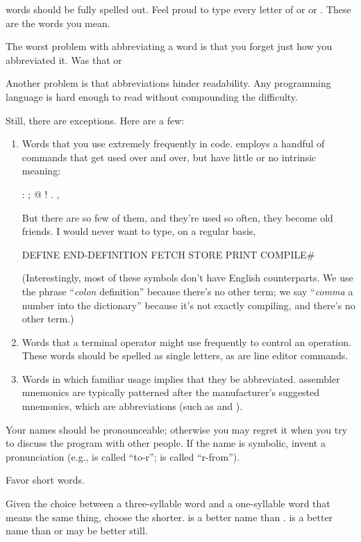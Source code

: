 \Forth{} words should be fully spelled out.  Feel proud to type every
letter of  or  or .
These are the words you mean.

The worst problem with abbreviating a word is that you forget just
how you abbreviated it.  Was that  or 

Another problem is that abbreviations hinder readability.
Any programming language is hard enough to read without compounding
the difficulty.

Still, there are exceptions.  Here are a few:

\begin{enumerate}
\item Words that you use extremely frequently in code. \Forth{}
employs a handful of commands that get used over and over, but have
little or no intrinsic meaning:
\begin{Code}
:   ;   @   !   .   ,
\end{Code}
But there are so few of them, and they're used so often, they become
old friends.  I would never want to type, on a regular basis,
\begin{Code}
DEFINE   END-DEFINITION   FETCH   STORE
     PRINT   COMPILE#
\end{Code}
(Interestingly, most of these symbols don't have English counterparts.
We use the phrase ``\emph{colon} definition'' because there's no other
term; we say ``\emph{comma} a number into the dictionary'' because
it's not exactly compiling, and there's no other term.)
\item Words that a terminal operator might use frequently to control
an operation.  These words should be spelled as single letters, as are
line editor commands.
\item Words in which familiar usage implies that they be abbreviated.
\Forth{} assembler mnemonics are typically patterned after the
manufacturer's suggested mnemonics, which are abbreviations (such as
 and ).
\end{enumerate}
Your names should be pronounceable; otherwise you may regret it when
you try to discuss the program with other people.  If the name is
symbolic, invent a pronunciation (e.g.,  is called ``to-r'';
 is called ``r-from'').

\begin{tip}
Favor short words.
\end{tip}
Given the choice between a three-syllable word and a one-syllable word
that means the same thing, choose the shorter.   is a
better name than .   is a better name
than    or  may be
better still.

